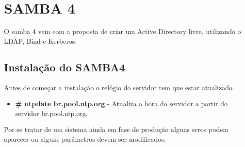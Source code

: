 \chapter{SAMBA 4}

O samba 4 vem com a proposta de criar um Active Directory livre, utilizando o LDAP, Bind e Kerberos.

\section{Instalação do SAMBA4}

Antes de começar a instalação o relógio do servidor tem que estar atualizado.

\begin{itemize}
	\item \textbf{\# ntpdate br.pool.ntp.org} - Atualiza a hora do servidor a partir do servidor br.pool.ntp.org.
\end{itemize}

Por se tratar de um sistema ainda em fase de produção alguns erros podem aparecer ou alguns parâmetros devem ser modificados.

